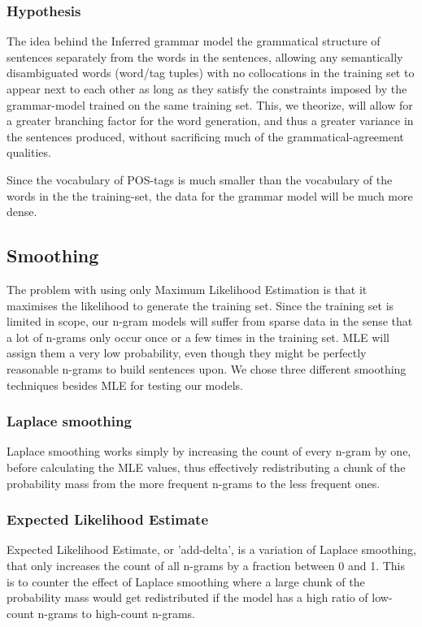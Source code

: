 \documentclass[a4paper,12pt]{article}
\begin{document}
\subsubsection{Hypothesis}
The idea behind the Inferred grammar model the grammatical structure of sentences separately from the words in the sentences, allowing any semantically disambiguated words (word/tag tuples) with no collocations in the training set to appear next to each other as long as they satisfy the constraints imposed by the grammar-model trained on the same training set. This, we theorize, will allow for a greater branching factor for the word generation, and thus a greater variance in the sentences produced, without sacrificing much of the grammatical-agreement qualities.

Since the vocabulary of POS-tags is much smaller than the vocabulary of the words in the the training-set, the data for the grammar model will be much more dense. 

\subsection{Smoothing}
\label{subsec:smoothing}

The problem with using only Maximum Likelihood Estimation is that it maximises the likelihood to generate the training set. Since the training set is limited in scope, our n-gram models will suffer from sparse data in the sense that a lot of n-grams only occur once or a few times in the training set. MLE will assign them a very low probability, even though they might be perfectly reasonable n-grams to build sentences upon. We chose three different smoothing techniques besides MLE for testing our models.

\subsubsection{Laplace smoothing}
Laplace smoothing works simply by increasing the count of every n-gram by one, before calculating the MLE values, thus effectively redistributing a chunk of the probability mass from the more frequent n-grams to the less frequent ones.

\subsubsection{Expected Likelihood Estimate}
Expected Likelihood Estimate, or 'add-delta', is a variation of Laplace smoothing, that only increases the count of all n-grams by a fraction between 0 and 1. This is to counter the effect of Laplace smoothing where a large chunk of the probability mass would get redistributed if the model has a high ratio of low-count n-grams to high-count n-grams.
\end{document}
